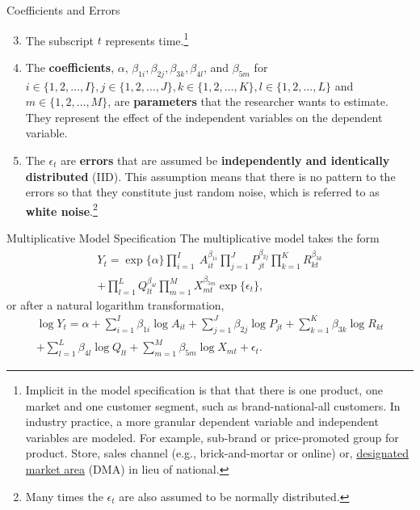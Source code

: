 \documentclass[pdf]{beamer}
\newcommand{\empr}[1]{{\color{franklinblue}\textbf{#1}}}
\theoremstyle{remark}
\theoremstyle{definition}
\begin{document}
\begin{frame}[t]{Coefficients and Errors}
\small
 \begin{enumerate}
 \setcounter{enumi}{2} 
  \item The subscript $t$ represents time.\footnote{Implicit in the model specification is that that there is one product, one market and one customer segment, such as brand-national-all customers.  In industry practice, a more granular dependent variable and independent variables are modeled.  For example, sub-brand or price-promoted group for product. Store, sales channel (e.g., brick-and-mortar or online) or, \href{https://markets.nielsen.com/us/en/contact-us/intl-campaigns/dma-maps/}{designated market area} (DMA) in lieu of national. %
  }
 \item The \empr{coefficients}, $\alpha$, $\beta_{1i}, \beta_{2j}, \beta_{3k}, \beta_{4l}$, and $\beta_{5m}$ for $i \in \{1,2,\ldots, I\}, j \in \{1,2,\ldots, J\}, k \in \{1,2,\ldots, K\}, l \in \{1,2,\ldots, L\}$ and $m \in \{1,2,\ldots, M\}$,  are \empr{parameters} that the researcher wants to estimate. They represent the effect of the independent variables on the dependent variable. 
  \item The $\epsilon_t$  are \empr{errors} that are assumed be \empr{independently and identically distributed} (IID).   This assumption means that there is no pattern to the errors so that they constitute just random noise, which is referred to as \empr{white noise}.\footnote{Many times the $\epsilon_t$ are also assumed to be normally distributed.} 
\end{enumerate}
\end{frame}

\begin{frame}[t]{Multiplicative Model Specification}
The multiplicative model takes the form
\begin{multline} \label{eq:2}
Y_{t} = \exp\{\alpha\} \prod_{i=1}^{I}\ A_{it}^{\beta_{1i}} \prod_{j=1}^{J}P_{jt}^{\beta_{2j}} \prod_{k=1}^{K}R_{kt}^{\beta_{3k}} \\ 
 + \prod_{l=1}^{L}Q_{lt}^{\beta_{4l}} \prod_{m=1}^{M}X_{mt}^{\beta_{5m}} \exp\{\epsilon_t\},
 \end{multline} 
or after a  natural logarithm transformation, 
\small
\begin{multline} \label{eq:3}
\log Y_{t} = \alpha + \sum_{i=1}^{I}\beta_{1i} \log A_{it} + \sum_{j=1}^{J}\beta_{2j} \log P_{jt} + \sum_{k=1}^{K}\beta_{3k}\log R_{kt} \\ 
 + \sum_{l=1}^{L}\beta_{4l} \log Q_{lt} + \sum_{m=1}^{M}\beta_{5m} \log  X_{mt} + \epsilon_t.
 \end{multline}
 \normalsize
\end{frame}
\end{document}
